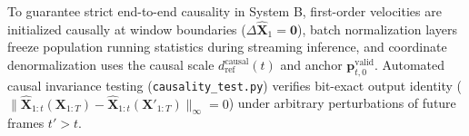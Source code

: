 
To guarantee strict end-to-end causality in System B, first-order velocities are initialized causally at window boundaries ($\Delta \hat{\mathbf{X}}_1 = \mathbf{0}$), batch normalization layers freeze population running statistics during streaming inference, and coordinate denormalization uses the causal scale $d_{\text{ref}}^{\text{causal}}(t)$ and anchor $\mathbf{p}_{t,0}^{\text{valid}}$. Automated causal invariance testing (\texttt{causality\_test.py}) verifies bit-exact output identity ($\|\hat{\mathbf{X}}_{1:t}(\mathbf{X}_{1:T}) - \hat{\mathbf{X}}_{1:t}(\mathbf{X}'_{1:T})\|_{\infty} = 0$) under arbitrary perturbations of future frames $t' > t$.

